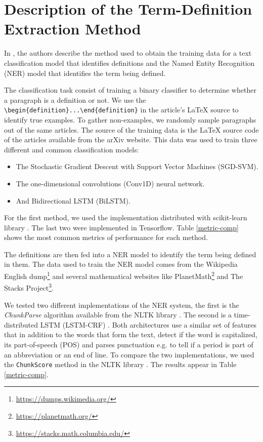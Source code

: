 \documentclass[submission,copyright,creativecommons]{eptcs}
\begin{document}
\section{Description of the Term-Definition Extraction Method}
In \cite{glossary, Deyan1}, the authors describe the 
method used  to obtain the training data for a text classification
model that identifies definitions and the Named Entity Recognition (NER) model that identifies the term being defined. 

The classification task consist of training a binary classifier to determine whether a paragraph is a definition or not. We use the \verb/\begin{definition}...\end{definition}/ in the article's \LaTeX{} source to identify true examples. To gather non-examples, we randomly sample paragraphs out of the same articles.
The source of the training data is the \LaTeX{} source code of the articles available from the arXiv website. This data was used to train three different and common classification models:
\begin{itemize}
    \item The Stochastic Gradient Descent with Support Vector Machines (SGD-SVM). 
    \item The one-dimensional convolutions (Conv1D) neural network.
    \item And Bidirectional LSTM (BiLSTM). 
\end{itemize}
For the first method, we used the implementation distributed with scikit-learn library \cite{scikit-learn}. The last two were implemented in Tensorflow. Table \ref{metric-comp} shows the most common metrics of performance for each method. 

The definitions are then fed into a NER model to identify the term being defined in them.
The data used to train the NER model comes from the Wikipedia English dump\footnote{\url{https://dumps.wikimedia.org/}} and several mathematical websites like
PlanetMath\footnote{\url{https://planetmath.org/}} and The Stacks
Project\footnote{\url{https://stacks.math.columbia.edu/}}.

We tested two different implementations of the NER system, the first is the \emph{ChunkParse} algorithm available from the NLTK library \cite{bird2009natural}. The second is a time-distributed LSTM (LSTM-CRF) \cite{huang2015bidirectional}. Both architectures use a similar set of features that in addition to the words that form the text, detect if the word is capitalized, its part-of-speech (POS) and parses punctuation e.g. to tell if a period is part of an abbreviation or an end of line.
To compare the two implementations, we used the \texttt{ChunkScore} method in
the NLTK library \cite{bird2009natural}. The results appear in Table \ref{metric-comp}. 
\end{document}
